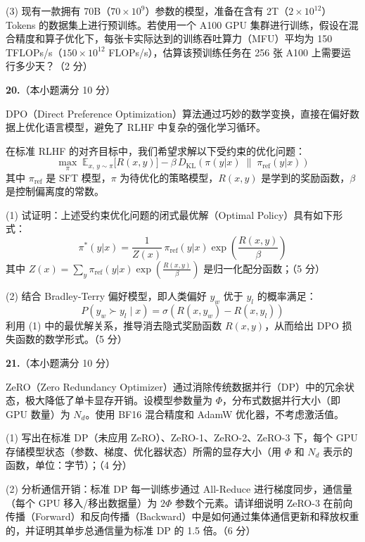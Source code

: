 \documentclass[a4paper]{ctexart}
\begin{document}
\vspace{0.3em}
(3) 现有一款拥有 70B（$70 \times 10^9$）参数的模型，准备在含有 2T（$2 \times 10^{12}$）Tokens 的数据集上进行预训练。若使用一个 A100 GPU 集群进行训练，假设在混合精度和算子优化下，每张卡实际达到的训练吞吐算力（MFU）平均为 150 TFLOPs/s（$150 \times 10^{12}$ FLOPs/s），估算该预训练任务在 256 张 A100 上需要运行多少天？（2 分）

\vspace{9em}

\noindent\textbf{20.}（本小题满分 10 分）

DPO（Direct Preference Optimization）算法通过巧妙的数学变换，直接在偏好数据上优化语言模型，避免了 RLHF 中复杂的强化学习循环。

在标准 RLHF 的对齐目标中，我们希望求解以下受约束的优化问题：
$$\max_{\pi}\; \mathbb{E}_{x,\,y\sim\pi}\!\bigl[R(x,y)\bigr]-\beta\,D_{\mathrm{KL}}\!\left(\pi(y|x)\;\|\;\pi_{\mathrm{ref}}(y|x)\right)$$
其中 $\pi_{\mathrm{ref}}$ 是 SFT 模型，$\pi$ 为待优化的策略模型，$R(x,y)$ 是学到的奖励函数，$\beta$ 是控制偏离度的常数。

\vspace{0.3em}
(1) 试证明：上述受约束优化问题的闭式最优解（Optimal Policy）具有如下形式：
$$\pi^*(y|x)=\frac{1}{Z(x)}\,\pi_{\mathrm{ref}}(y|x)\exp\!\left(\frac{R(x,y)}{\beta}\right)$$
其中 $Z(x)=\sum_y\pi_{\mathrm{ref}}(y|x)\exp\!\left(\frac{R(x,y)}{\beta}\right)$ 是归一化配分函数；（5 分）

\vspace{0.3em}
(2) 结合 Bradley-Terry 偏好模型，即人类偏好 $y_w$ 优于 $y_l$ 的概率满足：
$$P(y_w\succ y_l\mid x)=\sigma\!\left(R(x,y_w)-R(x,y_l)\right)$$
利用 (1) 中的最优解关系，推导消去隐式奖励函数 $R(x,y)$，从而给出 DPO 损失函数的数学形式。（5 分）

\vspace{10em}

\noindent\textbf{21.}（本小题满分 10 分）

ZeRO（Zero Redundancy Optimizer）通过消除传统数据并行（DP）中的冗余状态，极大降低了单卡显存开销。设模型参数量为 $\Phi$，分布式数据并行大小（即 GPU 数量）为 $N_d$。使用 BF16 混合精度和 AdamW 优化器，不考虑激活值。

\vspace{0.3em}
(1) 写出在标准 DP（未应用 ZeRO）、ZeRO-1、ZeRO-2、ZeRO-3 下，每个 GPU 存储模型状态（参数、梯度、优化器状态）所需的显存大小（用 $\Phi$ 和 $N_d$ 表示的函数，单位：字节）；（4 分）

\vspace{0.3em}
(2) 分析通信开销：标准 DP 每一训练步通过 All-Reduce 进行梯度同步，通信量（每个 GPU 移入/移出数据量）为 $2\Phi$ 参数个元素。请详细说明 ZeRO-3 在前向传播（Forward）和反向传播（Backward）中是如何通过集体通信更新和释放权重的，并证明其单步总通信量为标准 DP 的 1.5 倍。（6 分）
\end{document}
